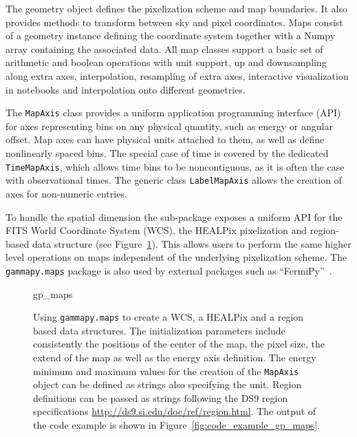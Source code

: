\documentclass[longauth]{aa}
\newcommand{\code}[1]{\texttt{#1}}
\newcommand{\numpy}{Numpy\xspace}
\begin{document}
The geometry object defines the pixelization scheme and map boundaries. It also
provides methods to transform between sky and pixel coordinates. Maps consist
of a geometry instance defining the coordinate system together with a
\numpy array containing the associated data. All map classes support a basic
set of arithmetic and boolean operations with  unit support, up and downsampling
along extra axes, interpolation, resampling of extra axes, interactive visualization
in notebooks and interpolation onto different geometries.

The \code{MapAxis} class provides a uniform application programming interface
(API) for axes representing
bins on any physical quantity, such as energy or angular offset.
Map axes can have physical units attached to them, as well as define
nonlinearly spaced bins. The special case of time is covered by the
dedicated \code{TimeMapAxis}, which allows time bins to be noncontiguous,
as it is often the case with observational times. The generic
class \code{LabelMapAxis} allows the creation of axes for non-numeric entries.

To handle the spatial dimension the sub-package exposes a uniform API for
the FITS World Coordinate System (WCS), the HEALPix pixelization and
region-based data structure (see Figure~\ref{fig*:minted:gp_maps}).
This allows users to perform the same higher level operations on maps
independent of the underlying pixelization scheme. The \code{gammapy.maps}
package is also used by external packages such as \enquote{FermiPy}~\citep{Wood2017}.

\begin{figure}
        \small
        {gp_maps}

        \caption{
        Using \code{gammapy.maps} to create a WCS, a HEALPix and a region
                based data structures. The initialization parameters include
        consistently the positions of the center of the map, the pixel
        size, the extend of the map as well as the energy axis definition.
        The energy minimum and maximum values for the creation of the
        \code{MapAxis} object can be defined as strings also specifying the
        unit. Region definitions can be passed as strings following
        the DS9 region specifications \url{http://ds9.si.edu/doc/ref/region.html}. The output
                of the code example is shown in Figure~\ref{fig:code_example_gp_maps}.
        }
    \label{fig*:minted:gp_maps}
\end{figure}
\end{document}
